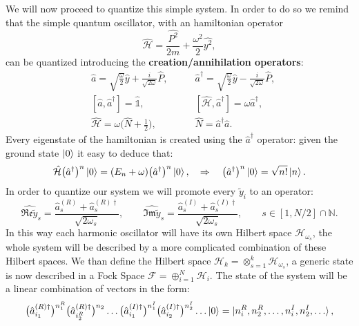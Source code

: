 We will now proceed to quantize this simple system. In order to do so we remind that the simple quantum oscillator, with an hamiltonian operator
\begin{equation*}
    \hat{\mathcal{H}}=\frac{\hat{ P^2}}{2m}+\frac{\omega^2}{2}\hat{ y^2}, 
\end{equation*}
can be quantized introducing the \textbf{creation/annihilation operators}:
\begin{align*}
    &\hat{ a}=\sqrt{\frac{\omega}{2}}\hat{y} +\frac{i}{\sqrt{2\omega}}\hat{ P},\qquad &\hat{a}^\dagger=\sqrt{\frac{\omega}{2}}\hat{ y} -\frac{i}{\sqrt{2\omega}}\hat{ P},\\ &[\hat{a},\hat{ a}^\dagger ]=\hat{\mathds{1}},\qquad &[\hat{\mathcal{H}},\hat{ a}^\dagger ]=\omega\hat{ a}^\dagger,\\
    &\hat{ \mathcal{H}} =\omega\bigg(\hat{N}+\frac{1}{2}\bigg),&\hat N=\hat{ a}^\dagger\hat{ a}.
\end{align*}
Every eigenstate of the hamiltonian is created using the $\hat a^\dagger$ operator: given the ground state $\ket{0}$ it easy to deduce that:
\begin{equation*}
    \hat{\mathcal{H}} \big(\hat{a}^\dagger \big)^n\ket{0}=(E_n+\omega)\big(\hat{a}^\dagger\big)^n\ket{0},\quad \Rightarrow\quad \big(\hat{a}^\dagger \big)^n\ket{0}=\sqrt{n!}\ket{n}.
\end{equation*}
In order to quantize our system we will promote every $\tilde y_i$ to an operator:
\begin{equation*}
        \hat{\mathfrak{Re}\tilde{y} }_s=\frac{\hat{a}^{(R)}_{s}+\hat{a}^{(R)\dagger}_{s}}{\sqrt{2\omega_s}},\qquad
        \hat{\mathfrak{Im} \tilde{y} }_s=\frac{\hat{a}^{(I)}_{s}+\hat{a}^{(I)\dagger}_{s}}{\sqrt{2\omega_s}},\qquad s\in[1,N/2]\cap\mathbb{N}. 
\end{equation*} 
In this way each harmonic oscillator will have its own Hilbert space $\mathcal{H}_{\omega_s}$, the whole system will be described by a more complicated combination of these Hilbert spaces. We than define the Hilbert space $\mathcal{H}_k=\otimes_{s=1}^k \mathcal{H}_{\omega_s}$, a generic state is now described in a Fock Space $\mathcal{F} =\oplus_{i=1}^{N} \mathcal{H}_i$. The state of the system will be a linear combination of vectors in the form:
\begin{equation*}
    \big(\hat{a}^{(R)\dagger}_{i_1}\big)^{n_1^R}\big(\hat{a}^{(R)\dagger}_{i_2^R}\big)^{n_2}\dots \big(\hat{a}^{(I)\dagger}_{i_1}\big)^{n_1^I}\big(\hat{a}^{(I)\dagger}_{i_2}\big)^{n_2^I}\dots\ket{0}=\ket{n_i^R,n_2^R,\dots,n_i^I,n_2^I,\dots},
\end{equation*}
